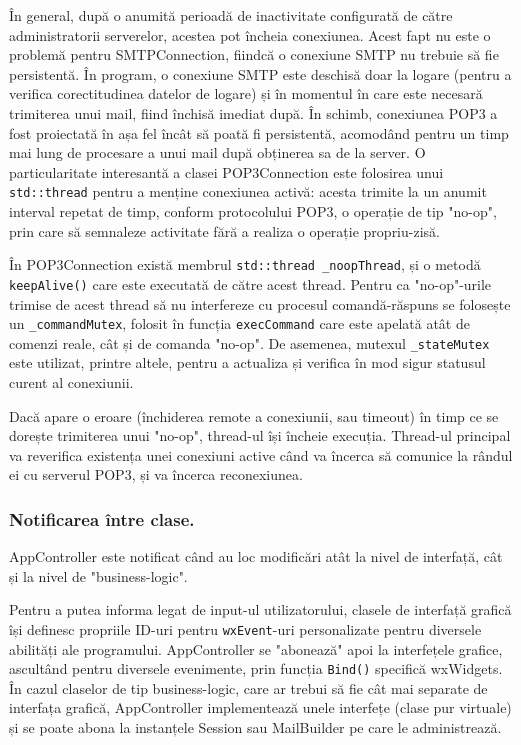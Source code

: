 \documentclass[runningheads]{llncs}
\begin{document}
În general, după o anumită perioadă de inactivitate configurată de către administratorii serverelor, acestea pot încheia conexiunea. Acest fapt nu este o problemă pentru SMTPConnection, fiindcă o conexiune SMTP nu trebuie să fie persistentă. În program, o conexiune SMTP este deschisă doar la logare (pentru a verifica corectitudinea datelor de logare) și în momentul în care este necesară trimiterea unui mail, fiind închisă imediat după. În schimb, conexiunea POP3 a fost proiectată în așa fel încât să poată fi persistentă, acomodând pentru un timp mai lung de procesare a unui mail după obținerea sa de la server. O particularitate interesantă a clasei POP3Connection este folosirea unui \texttt{std::thread} pentru a menține conexiunea activă: acesta trimite la un anumit interval repetat de timp, conform protocolului POP3, o operație de tip "no-op", prin care să semnaleze activitate fără a realiza o operație propriu-zisă.

În POP3Connection există membrul \texttt{std::thread \_noopThread}, și o metodă \texttt{keepAlive()} care este executată de către acest thread. Pentru ca "no-op"-urile trimise de acest thread să nu interfereze cu procesul comandă-răspuns se folosește un \texttt{\_commandMutex}, folosit în funcția \texttt{execCommand} care este apelată atât de comenzi reale, cât și de comanda "no-op". De asemenea, mutexul \texttt{\_stateMutex} este utilizat, printre altele, pentru a actualiza și verifica în mod sigur statusul curent al conexiunii.

Dacă apare o eroare (închiderea remote a conexiunii, sau timeout) în timp ce se dorește trimiterea unui "no-op", thread-ul își încheie execuția. Thread-ul principal va reverifica existența unei conexiuni active când va încerca să comunice la rândul ei cu serverul POP3, și va încerca reconexiunea.


\subsubsection{Notificarea între clase.} AppController este notificat când au loc modificări atât la nivel de interfață, cât și la nivel de "business-logic".

Pentru a putea informa legat de input-ul utilizatorului, clasele de interfață grafică își definesc propriile ID-uri pentru \texttt{wxEvent}-uri personalizate pentru diversele abilități ale programului. AppController se "abonează" apoi la interfețele grafice, ascultând pentru diversele evenimente, prin funcția \texttt{Bind()} specifică wxWidgets. În cazul claselor de tip business-logic, care ar trebui să fie cât mai separate de interfața grafică, AppController implementează unele interfețe (clase pur virtuale) și se poate abona la instanțele Session sau MailBuilder pe care le administrează.
\end{document}
